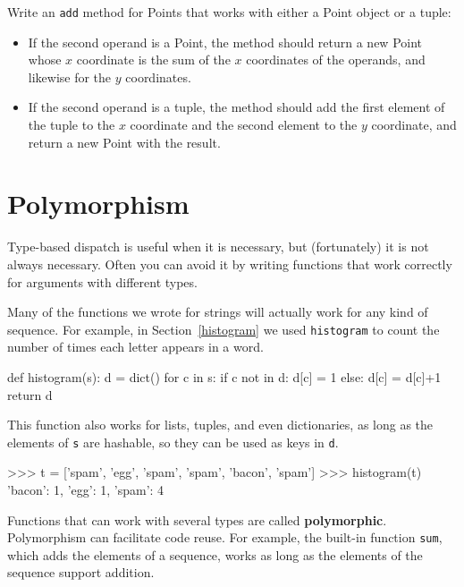 \begin{exercise}
Write an {\tt add} method for Points that works with either a
Point object or a tuple:  
\begin{itemize}

\item If the second operand is a Point, the method should return a new
Point whose $x$ coordinate is the sum of the $x$ coordinates of the
operands, and likewise for the $y$ coordinates.

\item If the second operand is a tuple, the method should add the
first element of the tuple to the $x$ coordinate and the second
element to the $y$ coordinate, and return a new Point with the result. 

\end{itemize}

\end{exercise}


\section{Polymorphism}

Type-based dispatch is useful when it is necessary, but (fortunately)
it is not always necessary.  Often you can avoid it by writing functions
that work correctly for arguments with different types.


Many of the functions we wrote for strings will actually
work for any kind of sequence.
For example, in Section~\ref{histogram}
we used {\tt histogram} to count the number of times each letter
appears in a word.

\beforeverb
\begin{pycode}
def histogram(s):
    d = dict()
    for c in s:
        if c not in d:
            d[c] = 1
        else:
            d[c] = d[c]+1
    return d
\end{pycode}
\afterverb
%
This function also works for lists, tuples, and even dictionaries,
as long as the elements of {\tt s} are hashable, so they can be used
as keys in {\tt d}.

\beforeverb
\begin{pyinterpreter}
>>> t = ['spam', 'egg', 'spam', 'spam', 'bacon', 'spam']
>>> histogram(t)
{'bacon': 1, 'egg': 1, 'spam': 4}
\end{pyinterpreter}
\afterverb
%
Functions that can work with several types are called {\bf polymorphic}.
Polymorphism can facilitate code reuse.  For example, the built-in
function {\tt sum}, which adds the elements of a sequence, works
as long as the elements of the sequence support addition.

